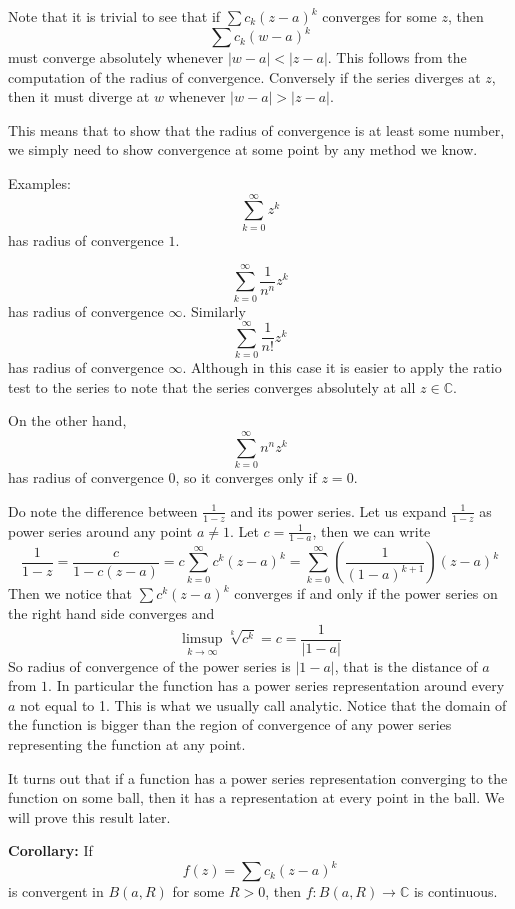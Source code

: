 \documentclass[12pt]{book}
\newcommand{\abs}[1]{\left\lvert {#1} \right\rvert}
\newcommand{\C}{{\mathbb{C}}}
\theoremstyle{plain}
\theoremstyle{remark}
\theoremstyle{definition}
\theoremstyle{exercise}
\theoremstyle{example}
\begin{document}
Note that it is trivial to see that if $\sum c_k {(z-a)}^k$ converges
for some $z$, then
$$\sum c_k {(w-a)}^k$$
must converge absolutely whenever $\abs{w-a} < \abs{z-a}$.  This follows
from the computation of the radius of convergence.
Conversely if the series diverges at $z$, then it must diverge at $w$
whenever $\abs{w-a} > \abs{z-a}$.

This means that to show
that the radius of convergence is at least some number, we simply need to
show convergence at some point by any method we know.

\medskip

Examples:
$$
\sum_{k=0}^\infty z^k
$$
has radius of convergence $1$.

$$
\sum_{k=0}^\infty \frac{1}{n^n} z^k
$$
has radius of convergence $\infty$.  Similarly
$$
\sum_{k=0}^\infty \frac{1}{n!} z^k
$$
has radius of convergence $\infty$.  Although in this case it is easier to
apply the ratio test to the series to note that the series converges
absolutely at all $z \in \C$.

On the other hand,
$$
\sum_{k=0}^\infty n^n z^k
$$
has radius of convergence 0, so it converges only if $z=0$.

\medskip

Do note the difference between $\frac{1}{1-z}$ and its power series.  Let us
expand $\frac{1}{1-z}$ as power series around any point $a \not= 1$.
Let $c = \frac{1}{1-a}$, then we can write
$$
\frac{1}{1-z} = 
\frac{c}{1-c(z-a)}
=
c
\sum_{k=0}^\infty c^{k} {(z-a)}^k
=
\sum_{k=0}^\infty \left( \frac{1}{{(1-a)}^{k+1}} \right) {(z-a)}^k
$$
Then we notice that $\sum c^k {(z-a)}^k$ converges if and only if 
the power series on the right hand side converges and
$$
\limsup_{k\to\infty}
\sqrt[k]{c^k} = c
= \frac{1}{\abs{1-a}}
$$
So radius of convergence of the power series is $\abs{1-a}$, that is the
distance of $a$ from $1$.  In particular the function has a power series
representation around every $a$ not equal to 1.  This is what we usually call
analytic.  Notice that the domain of the function is bigger than the region
of convergence of any power series representing the function at any point.

It turns out that 
if a function has a power series representation converging to the function
on some ball,
then it has a representation at every point in the ball.  We will prove this
result later.

\medskip

\textbf{Corollary:}
If $$f(z) = \sum c_k {(z-a)}^k$$ is convergent in $B(a,R)$ for some $R > 0$, then
$f \colon B(a,R) \to \C$ is continuous.
\end{document}
